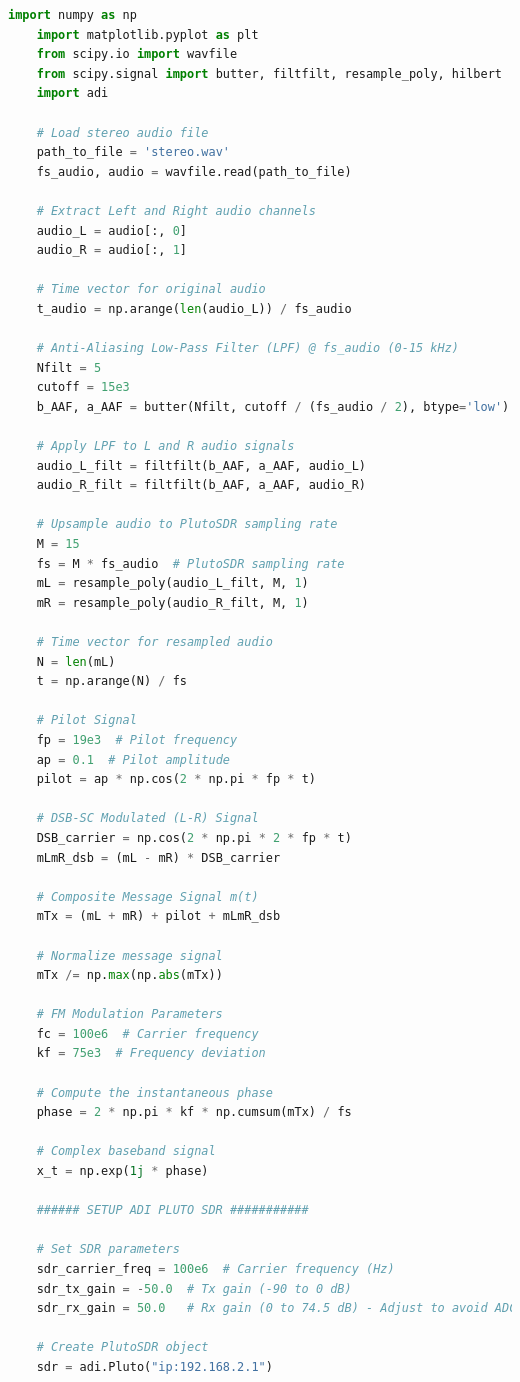 \documentclass[
	letterpaper, %
	10pt, %
]{CSUniSchoolLabReport}
\begin{document}
\begin{lstlisting}[language=Python]
	import numpy as np
	import matplotlib.pyplot as plt
	from scipy.io import wavfile
	from scipy.signal import butter, filtfilt, resample_poly, hilbert
	import adi
	
	# Load stereo audio file
	path_to_file = 'stereo.wav'
	fs_audio, audio = wavfile.read(path_to_file)
	
	# Extract Left and Right audio channels
	audio_L = audio[:, 0]
	audio_R = audio[:, 1]
	
	# Time vector for original audio
	t_audio = np.arange(len(audio_L)) / fs_audio
	
	# Anti-Aliasing Low-Pass Filter (LPF) @ fs_audio (0-15 kHz)
	Nfilt = 5
	cutoff = 15e3
	b_AAF, a_AAF = butter(Nfilt, cutoff / (fs_audio / 2), btype='low')
	
	# Apply LPF to L and R audio signals
	audio_L_filt = filtfilt(b_AAF, a_AAF, audio_L)
	audio_R_filt = filtfilt(b_AAF, a_AAF, audio_R)
	
	# Upsample audio to PlutoSDR sampling rate
	M = 15
	fs = M * fs_audio  # PlutoSDR sampling rate
	mL = resample_poly(audio_L_filt, M, 1)
	mR = resample_poly(audio_R_filt, M, 1)
	
	# Time vector for resampled audio
	N = len(mL)
	t = np.arange(N) / fs
	
	# Pilot Signal
	fp = 19e3  # Pilot frequency
	ap = 0.1  # Pilot amplitude
	pilot = ap * np.cos(2 * np.pi * fp * t)
	
	# DSB-SC Modulated (L-R) Signal
	DSB_carrier = np.cos(2 * np.pi * 2 * fp * t)
	mLmR_dsb = (mL - mR) * DSB_carrier
	
	# Composite Message Signal m(t)
	mTx = (mL + mR) + pilot + mLmR_dsb
	
	# Normalize message signal
	mTx /= np.max(np.abs(mTx))
	
	# FM Modulation Parameters
	fc = 100e6  # Carrier frequency
	kf = 75e3  # Frequency deviation
	
	# Compute the instantaneous phase
	phase = 2 * np.pi * kf * np.cumsum(mTx) / fs
	
	# Complex baseband signal
	x_t = np.exp(1j * phase)
	
	###### SETUP ADI PLUTO SDR ###########
	
	# Set SDR parameters
	sdr_carrier_freq = 100e6  # Carrier frequency (Hz)
	sdr_tx_gain = -50.0  # Tx gain (-90 to 0 dB)
	sdr_rx_gain = 50.0   # Rx gain (0 to 74.5 dB) - Adjust to avoid ADC saturation
	
	# Create PlutoSDR object
	sdr = adi.Pluto("ip:192.168.2.1")
	

\end{lstlisting}
\end{document}
